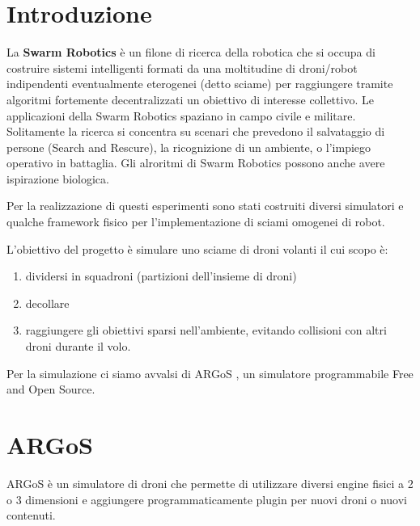 \documentclass[a4paper,11pt,oneside, table]{article}
\begin{document}
    \printindex
    \tableofcontents
    \renewcommand{\baselinestretch}{1.5}

\section{Introduzione}

La \textbf{Swarm Robotics} \`e un filone di ricerca della robotica che si occupa di costruire sistemi intelligenti formati da una moltitudine di droni/robot indipendenti eventualmente eterogenei (detto sciame) per raggiungere tramite algoritmi fortemente decentralizzati un obiettivo di interesse collettivo.
Le applicazioni della Swarm Robotics spaziano in campo civile e militare.
Solitamente la ricerca si concentra su scenari che prevedono il salvataggio di persone (Search and Rescure), la ricognizione di un ambiente, o l'impiego operativo in battaglia.
Gli alroritmi di Swarm Robotics possono anche avere ispirazione biologica\cite{mclurkin2005dynamic}.

Per la realizzazione di questi esperimenti sono stati costruiti diversi simulatori e qualche framework fisico per l'implementazione di sciami omogenei di robot.

L'obiettivo del progetto \`e simulare uno sciame di droni volanti il cui scopo \`e:
\begin{enumerate}
  \item dividersi in squadroni (partizioni dell'insieme di droni)
  \item decollare
  \item raggiungere gli obiettivi sparsi nell'ambiente, evitando collisioni con altri droni durante il volo.
\end{enumerate}


Per la simulazione ci siamo avvalsi di ARGoS \cite{Pinciroli:SI2012}, un simulatore programmabile Free and Open Source.

\section{ARGoS}

ARGoS \`e un simulatore di droni che permette di utilizzare diversi engine fisici a 2 o 3 dimensioni e aggiungere programmaticamente plugin per nuovi droni o nuovi contenuti.
\end{document}
